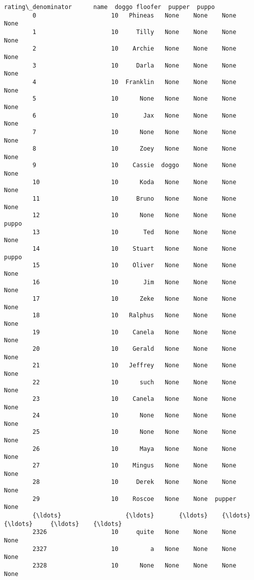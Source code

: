 \documentclass[11pt]{article}
\begin{document}
\begin{Verbatim}[commandchars=\\\{\}]
              rating\_denominator      name  doggo floofer  pupper  puppo  
        0                     10   Phineas   None    None    None   None  
        1                     10     Tilly   None    None    None   None  
        2                     10    Archie   None    None    None   None  
        3                     10     Darla   None    None    None   None  
        4                     10  Franklin   None    None    None   None  
        5                     10      None   None    None    None   None  
        6                     10       Jax   None    None    None   None  
        7                     10      None   None    None    None   None  
        8                     10      Zoey   None    None    None   None  
        9                     10    Cassie  doggo    None    None   None  
        10                    10      Koda   None    None    None   None  
        11                    10     Bruno   None    None    None   None  
        12                    10      None   None    None    None  puppo  
        13                    10       Ted   None    None    None   None  
        14                    10    Stuart   None    None    None  puppo  
        15                    10    Oliver   None    None    None   None  
        16                    10       Jim   None    None    None   None  
        17                    10      Zeke   None    None    None   None  
        18                    10   Ralphus   None    None    None   None  
        19                    10    Canela   None    None    None   None  
        20                    10    Gerald   None    None    None   None  
        21                    10   Jeffrey   None    None    None   None  
        22                    10      such   None    None    None   None  
        23                    10    Canela   None    None    None   None  
        24                    10      None   None    None    None   None  
        25                    10      None   None    None    None   None  
        26                    10      Maya   None    None    None   None  
        27                    10    Mingus   None    None    None   None  
        28                    10     Derek   None    None    None   None  
        29                    10    Roscoe   None    None  pupper   None  
        {\ldots}                  {\ldots}       {\ldots}    {\ldots}     {\ldots}     {\ldots}    {\ldots}  
        2326                  10     quite   None    None    None   None  
        2327                  10         a   None    None    None   None  
        2328                  10      None   None    None    None   None  

\end{Verbatim}
\end{document}
